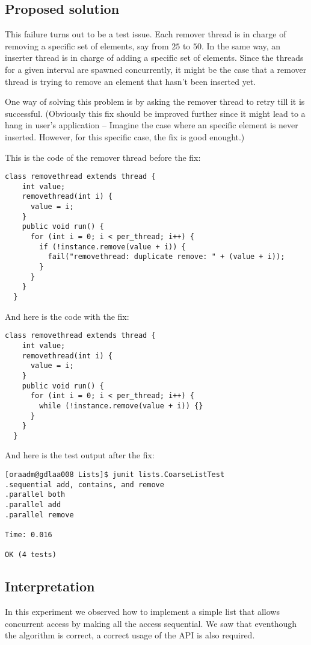 \subsection{Proposed solution}
\par
This failure turns out to be a test issue. Each remover thread is in charge of
removing a specific set of elements, say from $25$ to $50$. In the same way, an
inserter thread is in charge of adding a specific set of elements. Since the
threads for a given interval are spawned concurrently, it might be the case that
a remover thread is trying to remove an element that hasn't been inserted yet. 
\par
One way of solving this problem is by asking the remover thread to retry till it
is successful. (Obviously this fix should be improved further since it might
lead to a hang in user's application -- Imagine the case where an specific
element is never inserted. However, for this specific case, the fix is good
enought.)
\par
This is the code of the remover thread before the fix:
\par
\hfill
\begin{lstlisting}[style=numbers]
  class removethread extends thread {
    int value;
    removethread(int i) {
      value = i;
    }   
    public void run() {
      for (int i = 0; i < per_thread; i++) {
        if (!instance.remove(value + i)) {
          fail("removethread: duplicate remove: " + (value + i));
        }
      }   
    }   
  }
\end{lstlisting}
\hfill
\par
And here is the code with the fix:
\par
\hfill
\begin{lstlisting}[style=numbers]
  class removethread extends thread {
    int value;
    removethread(int i) {
      value = i;
    }   
    public void run() {
      for (int i = 0; i < per_thread; i++) {
        while (!instance.remove(value + i)) {}
      }   
    }   
  }
\end{lstlisting}
\hfill
\par
And here is the test output after the fix:
\par
\begin{verbatim}
[oraadm@gdlaa008 Lists]$ junit lists.CoarseListTest
.sequential add, contains, and remove
.parallel both
.parallel add
.parallel remove

Time: 0.016

OK (4 tests)
\end{verbatim}
\subsection{Interpretation}
In this experiment we observed how to implement a simple list that allows
concurrent access by making all the access sequential. We saw that eventhough
the algorithm is correct, a correct usage of the API is also required.
